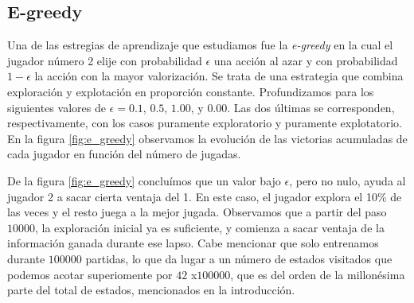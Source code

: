 \documentclass[11pt, spanish]{article}
\begin{document}
\subsection{E-greedy}
\par Una de las estregias de aprendizaje que estudiamos fue la \emph{e-greedy} 
en la cual el jugador número 2 elije con probabilidad $\epsilon$ una acción al 
azar y con probabilidad $1-\epsilon$ la acción con la mayor valorización. Se 
trata de una estrategia que combina exploración y explotación en proporción 
constante. Profundizamos para los siguientes valores de $\epsilon = 
0.1$, $0.5$, $1.00$, y $0.00$. Las dos últimas se corresponden, respectivamente, 
con los casos puramente exploratorio y puramente explotatorio. En la figura 
\ref{fig:e_greedy} observamos la evolución de las victorias acumuladas de cada 
jugador en función del número de jugadas.
\par De la figura \ref{fig:e_greedy} concluímos que un valor bajo $\epsilon$, 
pero no nulo, ayuda al jugador 2 a sacar cierta ventaja del 1. En este caso, el 
jugador explora el 10\% de las veces y el resto juega a la mejor jugada. 
Observamos que a partir del paso $10000$, la exploración inicial ya es 
suficiente, y comienza a sacar ventaja de la información ganada durante ese 
lapso. Cabe mencionar que solo entrenamos durante $100000$ partidas, lo que da lugar a un número de estados visitados que podemos acotar superiomente por $42$ x$100000$, que es del orden de la millonésima parte del total de estados, mencionados en la introducción.
\end{document}
